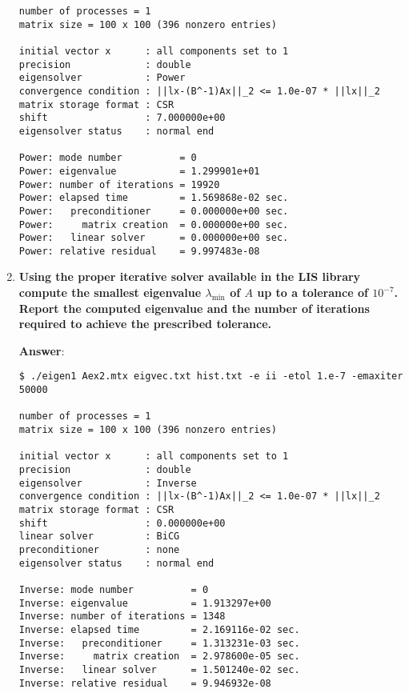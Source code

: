 \begin{enumerate}[label=\textcolor{Green3}{\textbf{\arabic*.}}]
\begin{lstlisting}[mathescape=false]
number of processes = 1
matrix size = 100 x 100 (396 nonzero entries)

initial vector x      : all components set to 1
precision             : double
eigensolver           : Power
convergence condition : ||lx-(B^-1)Ax||_2 <= 1.0e-07 * ||lx||_2
matrix storage format : CSR
shift                 : 7.000000e+00
eigensolver status    : normal end

Power: mode number          = 0
Power: eigenvalue           = 1.299901e+01
Power: number of iterations = 19920
Power: elapsed time         = 1.569868e-02 sec.
Power:   preconditioner     = 0.000000e+00 sec.
Power:     matrix creation  = 0.000000e+00 sec.
Power:   linear solver      = 0.000000e+00 sec.
Power: relative residual    = 9.997483e-08\end{lstlisting}




    \item \textcolor{Green3}{\textbf{%
        Using the proper iterative solver available in the LIS library compute the smallest eigenvalue $\lambda_{\min}$ of $A$ up to a tolerance of $10^{-7}$. Report the computed eigenvalue and the number of iterations required to achieve the prescribed tolerance.
    }}
    
    \textbf{Answer}:
    \begin{lstlisting}[mathescape=false]
$ ./eigen1 Aex2.mtx eigvec.txt hist.txt -e ii -etol 1.e-7 -emaxiter 50000

number of processes = 1
matrix size = 100 x 100 (396 nonzero entries)

initial vector x      : all components set to 1
precision             : double
eigensolver           : Inverse
convergence condition : ||lx-(B^-1)Ax||_2 <= 1.0e-07 * ||lx||_2
matrix storage format : CSR
shift                 : 0.000000e+00
linear solver         : BiCG
preconditioner        : none
eigensolver status    : normal end

Inverse: mode number          = 0
Inverse: eigenvalue           = 1.913297e+00
Inverse: number of iterations = 1348
Inverse: elapsed time         = 2.169116e-02 sec.
Inverse:   preconditioner     = 1.313231e-03 sec.
Inverse:     matrix creation  = 2.978600e-05 sec.
Inverse:   linear solver      = 1.501240e-02 sec.
Inverse: relative residual    = 9.946932e-08\end{lstlisting}
\end{enumerate}